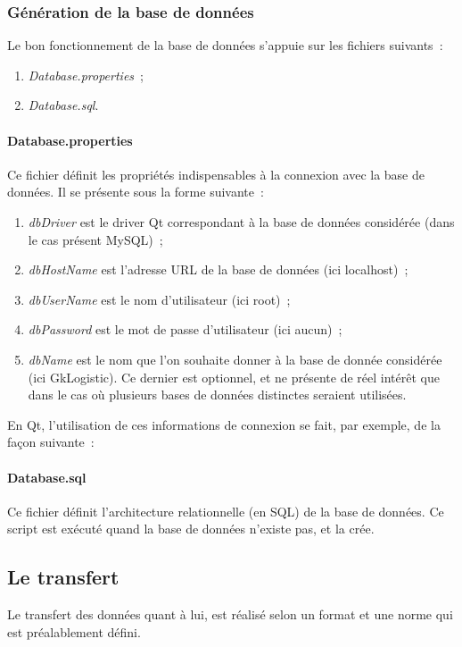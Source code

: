 \subsubsection{Génération de la base de données}
Le bon fonctionnement de la base de données s'appuie sur les fichiers suivants~:
\begin{enumerate}
	\item \emph{Database.properties}~;
	\item \emph{Database.sql}.
\end{enumerate}

\paragraph{Database.properties}
Ce fichier définit les propriétés indispensables à la connexion avec la base de données.
Il se présente sous la forme suivante~:

\label{Database.properties}
\begin{enumerate}
	\item \emph{dbDriver} est le driver Qt correspondant à la base de données considérée (dans le cas présent MySQL)~;
	\item \emph{dbHostName} est l'adresse URL de la base de données (ici localhost)~;
	\item \emph{dbUserName} est le nom d'utilisateur (ici root)~;
	\item \emph{dbPassword} est le mot de passe d'utilisateur (ici aucun)~;
	\item \emph{dbName} est le nom que l'on souhaite donner à la base de donnée considérée (ici GkLogistic). Ce dernier est optionnel, et ne présente de réel intérêt que dans le cas où plusieurs bases de données distinctes seraient utilisées.
\end{enumerate}
En Qt, l'utilisation de ces informations de connexion se fait, par exemple, de la façon suivante~:

\label{Database.example.cpp}

\paragraph{Database.sql}
Ce fichier définit l'architecture relationnelle (en SQL) de la base de données.
Ce script est exécuté quand la base de données n'existe pas, et la crée.

\subsection{Le transfert}
Le transfert des données quant à lui, est réalisé selon un format et une norme qui est préalablement défini.

